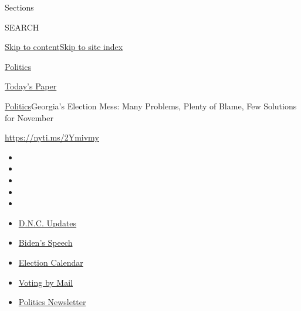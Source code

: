 Sections

SEARCH

\protect\hyperlink{site-content}{Skip to
content}\protect\hyperlink{site-index}{Skip to site index}

\href{https://www.nytimes3xbfgragh.onion/section/politics}{Politics}

\href{https://myaccount.nytimes3xbfgragh.onion/auth/login?response_type=cookie\&client_id=vi}{}

\href{https://www.nytimes3xbfgragh.onion/section/todayspaper}{Today's
Paper}

\href{/section/politics}{Politics}\textbar{}Georgia's Election Mess:
Many Problems, Plenty of Blame, Few Solutions for November

\url{https://nyti.ms/2Ymivmy}

\begin{itemize}
\item
\item
\item
\item
\item
\end{itemize}

\begin{itemize}
\item
  \href{https://www.nytimes3xbfgragh.onion/live/2020/08/20/us/dnc-convention-election?action=click\&pgtype=Article\&state=default\&region=TOP_BANNER\&context=storylines_menu}{D.N.C.
  Updates}
\item
  \href{https://www.nytimes3xbfgragh.onion/2020/08/20/us/politics/biden-presidential-nomination-dnc.html?action=click\&pgtype=Article\&state=default\&region=TOP_BANNER\&context=storylines_menu}{Biden's
  Speech}
\item
  \href{https://www.nytimes3xbfgragh.onion/interactive/2019/us/elections/2020-presidential-election-calendar.html?action=click\&pgtype=Article\&state=default\&region=TOP_BANNER\&context=storylines_menu}{Election
  Calendar}
\item
  \href{https://www.nytimes3xbfgragh.onion/interactive/2020/08/11/us/politics/vote-by-mail-us-states.html?action=click\&pgtype=Article\&state=default\&region=TOP_BANNER\&context=storylines_menu}{Voting
  by Mail}
\item
  \href{https://www.nytimes3xbfgragh.onion/newsletters/politics?action=click\&pgtype=Article\&state=default\&region=TOP_BANNER\&context=storylines_menu}{Politics
  Newsletter}
\end{itemize}

